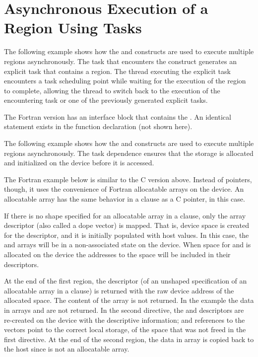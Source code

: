 \pagebreak
\chapter{Asynchronous Execution of a  Region Using Tasks}
\label{chap:async_target}

The following example shows how the  and  constructs 
are used to execute multiple  regions asynchronously. The task that 
encounters the  construct generates an explicit task that contains 
a  region. The thread executing the explicit task encounters a task 
scheduling point while waiting for the execution of the  region 
to complete, allowing the thread to switch back to the execution of the encountering 
task or one of the previously generated explicit tasks.


The Fortran version has an interface block that contains the  . 
An identical statement exists in the function declaration (not shown here).


The following example shows how the  and  constructs 
are used to execute multiple  regions asynchronously. The task dependence 
ensures that the storage is allocated and initialized on the device before it is 
accessed.


The Fortran example below is similar to the C version above. Instead of pointers, though, it uses
the convenience of Fortran allocatable arrays on the device. An allocatable array has the
same behavior in a  clause as a C pointer, in this case.

If there is no shape specified for an allocatable array in a  clause, only the array descriptor
(also called a dope vector) is mapped. That is, device space is created for the descriptor, and it
is initially populated with host values. In this case, the  and  arrays will be in a
non-associated state on the device. When space for  and  is allocated on the device
the addresses to the space will be included in their descriptors.

At the end of the first  region, the descriptor (of an unshaped specification of an allocatable
array in a  clause) is returned with the raw device address of the allocated space.
The content of the array is not returned. In the example the data in arrays  and 
are not returned. In the second  directive, the  and  descriptors are
re-created on the device with the descriptive information; and references to the
vectors point to the correct local storage, of the space that was not freed in the first 
directive.  At the end of the second  region, the data in array  is copied back
to the host since  is not an allocatable array.



